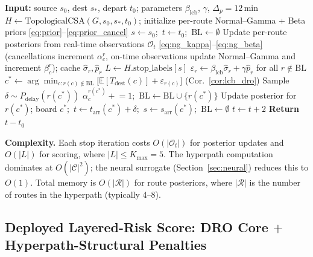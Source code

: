 \documentclass[11pt]{article}
\theoremstyle{definition}
\theoremstyle{remark}
\begin{document}
\begin{algorithm}[t]
\caption{DRO Hyperpath Routing (LCB-V1)}
\label{alg:dro}
\begin{algorithmic}[1]
\STATE \textbf{Input:} source $s_0$, dest $s_*$, depart $t_0$;
       parameters $\beta_{\mathrm{lcb}}$, $\gamma$, $\Delta_p{=}12$\,min
\STATE $H \gets \mathrm{TopologicalCSA}(G, s_0, s_*, t_0)$;
       initialize per-route Normal--Gamma + Beta priors
       \eqref{eq:prior}--\eqref{eq:prior_cancel}
\STATE $s \gets s_0$;\ $t \gets t_0$;\ $\mathrm{BL} \gets \emptyset$
    \STATE Update per-route posteriors from real-time observations
           $\mathcal{O}_t$
           \eqref{eq:ng_kappa}--\eqref{eq:ng_beta} (cancellations
           increment $\alpha_c^r$, on-time observations update
           Normal--Gamma and increment $\beta_c^r$); cache
           $\hat\sigma_r,\hat p_r$
    \STATE $L \gets H.\mathrm{stop\_labels}[s]$
    \REPEAT
        \STATE $\varepsilon_r \gets \beta_{\mathrm{lcb}}\hat\sigma_r
               + \gamma\hat p_r$ for all $r \notin \mathrm{BL}$
        \STATE $c^* \gets \arg\min_{c: r(c)\notin\mathrm{BL}}
               \bigl[\mathbb{E}[T_{\mathrm{dest}}(c)] + \varepsilon_{r(c)}\bigr]$
               \quad (Cor.~\ref{cor:lcb_dro})
        \STATE Sample $\delta \sim P_{\mathrm{delay}}(r(c^*))$
        \IF{$\delta {=} \infty$}
            \STATE $\alpha_c^{r(c^*)} \mathrel{+}{=} 1$;\
                   $\mathrm{BL} \gets \mathrm{BL} \cup \{r(c^*)\}$
            \STATE Update posterior for $r(c^*)$; board $c^*$;\
                   $t \gets t_{\mathrm{arr}}(c^*)+\delta$;\
                   $s \gets s_{\mathrm{arr}}(c^*)$;\ $\mathrm{BL} \gets \emptyset$
        \ELSE
            \STATE $t \gets t + 2$
        \ENDIF
\ENDWHILE
\STATE \textbf{Return} $t - t_0$
\end{algorithmic}
\end{algorithm}

\noindent\textbf{Complexity.}
Each stop iteration costs $O(|\mathcal{O}_t|)$ for posterior updates
and $O(|L|)$ for scoring, where $|L| \leq K_{\max} = 5$.
The hyperpath computation dominates at $O(|\mathcal{C}|^2)$;
the neural surrogate (Section~\ref{sec:neural}) reduces this to $O(1)$.
Total memory is $O(|\mathcal{R}|)$ for route posteriors, where $|\mathcal{R}|$
is the number of routes in the hyperpath (typically 4--8).

\subsection{Deployed Layered-Risk Score: DRO Core $+$ Hyperpath-Structural Penalties}
\label{sec:method-layered-score}
\end{document}
